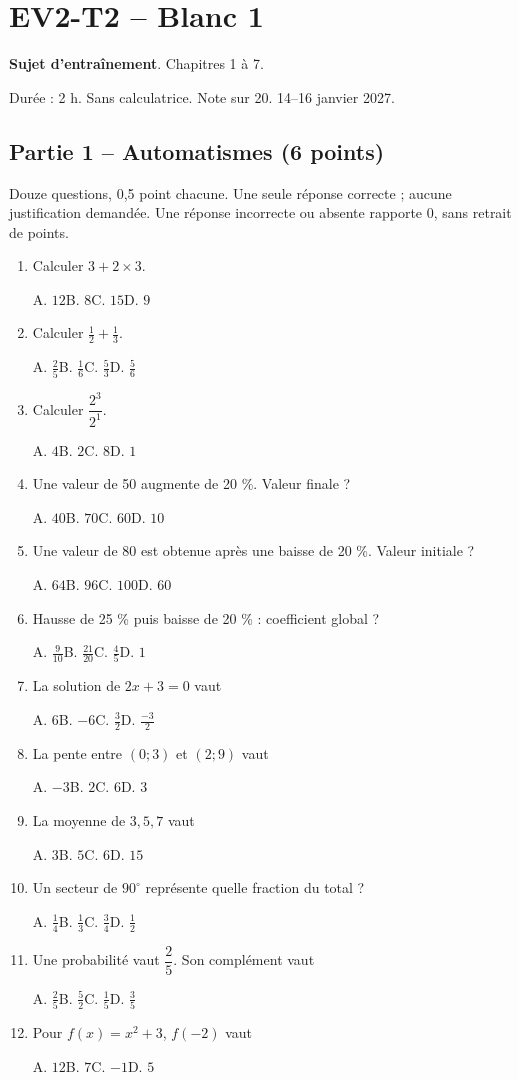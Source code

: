 \clearpage\section*{EV2-T2 -- Blanc 1}\label{EV2-T2}
\textbf{Sujet d’entraînement}. Chapitres 1 à 7.\par Durée : 2 h. Sans calculatrice. Note sur 20. 14–16 janvier 2027.
\subsection*{Partie 1 -- Automatismes (6 points)}
Douze questions, 0,5 point chacune. Une seule réponse correcte ; aucune justification demandée. Une réponse incorrecte ou absente rapporte 0, sans retrait de points.
\begin{enumerate}
\item Calculer $3+2\times3$.\par A. $12$\quad B. $8$\quad C. $15$\quad D. $9$
\item Calculer $\frac12+\frac13$.\par A. $\frac{2}{5}$\quad B. $\frac{1}{6}$\quad C. $\frac{5}{3}$\quad D. $\frac{5}{6}$
\item Calculer $\dfrac{2^3}{2^{1}}$.\par A. $4$\quad B. $2$\quad C. $8$\quad D. $1$
\item Une valeur de 50 augmente de 20 \%. Valeur finale ?\par A. $40$\quad B. $70$\quad C. $60$\quad D. $10$
\item Une valeur de 80 est obtenue après une baisse de 20 \%. Valeur initiale ?\par A. $64$\quad B. $96$\quad C. $100$\quad D. $60$
\item Hausse de 25 \% puis baisse de 20 \% : coefficient global ?\par A. $\frac{9}{10}$\quad B. $\frac{21}{20}$\quad C. $\frac{4}{5}$\quad D. $1$
\item La solution de $2x+3=0$ vaut\par A. $6$\quad B. $-6$\quad C. $\frac{3}{2}$\quad D. $\frac{-3}{2}$
\item La pente entre $(0;3)$ et $(2;9)$ vaut\par A. $-3$\quad B. $2$\quad C. $6$\quad D. $3$
\item La moyenne de $3, 5, 7$ vaut\par A. $3$\quad B. $5$\quad C. $6$\quad D. $15$
\item Un secteur de $90^\circ$ représente quelle fraction du total ?\par A. $\frac{1}{4}$\quad B. $\frac{1}{3}$\quad C. $\frac{3}{4}$\quad D. $\frac{1}{2}$
\item Une probabilité vaut $\dfrac{2}{5}$. Son complément vaut\par A. $\frac{2}{5}$\quad B. $\frac{5}{2}$\quad C. $\frac{1}{5}$\quad D. $\frac{3}{5}$
\item Pour $f(x)=x^2+3$, $f(-2)$ vaut\par A. $12$\quad B. $7$\quad C. $-1$\quad D. $5$
\end{enumerate}
